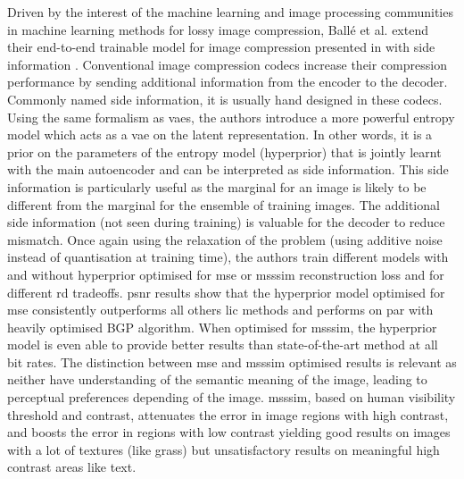 \documentclass{article}
\begin{document}
Driven by the interest of the machine learning and image processing communities in machine learning methods for lossy image compression, Ballé et al. extend their end-to-end trainable model for image compression presented in \cite{balle2017endtoendoptimizedimagecompression} with side information \cite{balle2018variationalimagecompressionscale}. Conventional image compression codecs increase their compression performance by sending additional information from the encoder to the decoder. Commonly named side information, it is usually hand designed in these codecs. Using the same formalism as \acrfull{vae}s, the authors introduce a more powerful entropy model which acts as a \acrshort{vae} on the latent representation. In other words, it is a prior on the parameters of the entropy model (hyperprior) that is jointly learnt with the main autoencoder and can be interpreted as side information. This side information is particularly useful as the marginal for an image is likely to be different from the marginal for the ensemble of training images. The additional side information (not seen during training) is valuable for the decoder to reduce mismatch. Once again using the relaxation of the problem (using additive noise instead of quantisation at training time), the authors train different models with and without hyperprior optimised for \acrshort{mse} or \acrshort{msssim} reconstruction loss and for different \acrshort{rd} tradeoffs. \acrshort{psnr} results show that the hyperprior model optimised for \acrshort{mse} consistently outperforms all others \acrshort{lic} methods and performs on par with heavily optimised BGP algorithm. When optimised for \acrshort{msssim}, the hyperprior model is even able to provide better results than state-of-the-art method at all bit rates. The distinction between \acrshort{mse} and \acrshort{msssim} optimised results is relevant as neither have understanding of the semantic meaning of the image, leading to perceptual preferences depending of the image. \acrshort{msssim}, based on human visibility threshold and contrast, attenuates the error in image regions with high contrast, and boosts the error in regions with low contrast yielding good results on images with a lot of textures (like grass) but unsatisfactory results on meaningful high contrast areas like text.
\end{document}
